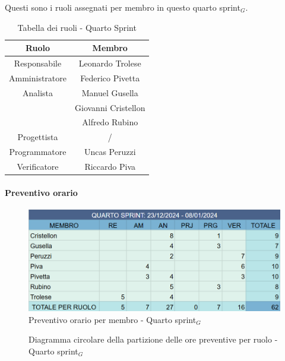 \documentclass[10pt]{article}
\begin{document}
{{{{{    Questi sono i ruoli assegnati per membro in questo quarto sprint$_G$.\\
    \begin{table}[H]
        \centering
        \begin{tabular}{|c|c|}
        \hline
        \rowcolor{gray!25}
        \textbf{Ruolo} & \textbf{Membro}\\
        \hline
        Responsabile & Leonardo Trolese\\
        \hline
        Amministratore & Federico Pivetta\\ 
        \hline
        Analista & Manuel Gusella\\
        & Giovanni Cristellon\\
        & Alfredo Rubino\\
        \hline
        Progettista & / \\
        \hline
        Programmatore & Uncas Peruzzi \\
        \hline
        Verificatore & Riccardo Piva\\
        \hline
        \end{tabular}
        \caption{Tabella dei ruoli - Quarto Sprint}
    \end{table}

    \paragraph{Preventivo orario}\mbox{}\vspace{0.4em}
    \begin{figure}[H]
    	\centering
    	\includegraphics[width=0.6\linewidth]{preventivoOreQuartoSprint.PNG}
    	\caption{Preventivo orario per membro - Quarto sprint$_G$}
    	\label{fig:Preventivo orario per membro - Quarto sprint$_G$}
    \end{figure}

    \begin{figure}[H]
        \centering
        \caption{Diagramma circolare della partizione delle ore preventive per ruolo - Quarto sprint$_G$ }
        \label{fig:Diagramma circolare della partizione delle ore preventive per ruolo - Quarto sprint$_G$}
    \end{figure}
    
}}}}}
\end{document}
